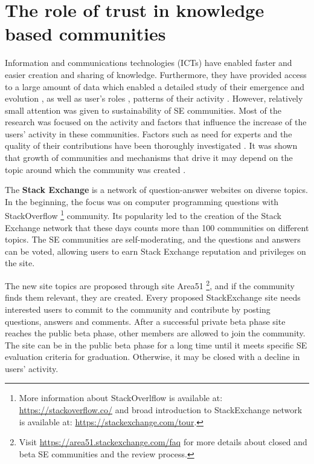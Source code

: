 
\chapter{The role of trust in knowledge based communities} %
\label{ChapterTrust}

Information and communications technologies (ICTs) have enabled faster and easier creation and sharing of knowledge. Furthermore, they have provided access to a large amount of data which enabled a detailed study of their emergence and evolution \cite{dankulov2015dynamics}, as well as user's roles \cite{saxena2021users}, patterns of their activity \cite{santos2019activity, slag2015one, chhabra2020activity}. 
However, relatively small attention was given to sustainability of SE communities. Most of the research was focused on the activity and factors that influence the increase of the users’ activity in these communities. Factors such as need for experts and the quality of their contributions have been thoroughly investigated \cite{dev2018size}. It was shown that growth of communities and mechanisms that drive it may depend on the topic around which the community was created \cite{santos2019self}.

The \textbf{Stack Exchange} is a network of question-answer websites on diverse topics. In the beginning, the focus was on computer programming questions with StackOverflow \footnote{
	More information about StackOverlflow is available at: \url{https://stackoverflow.co/} and broad introduction to StackExchange network is available at: \url{https://stackexchange.com/tour}. 
}  community. Its popularity led to the creation of the Stack Exchange network that these days counts more than 100 communities on different topics. The SE communities are self-moderating, and the questions and answers can be voted, allowing users to earn Stack Exchange reputation and privileges on the site. 

The new site topics are proposed through site Area51 \footnote{Visit \url{https://area51.stackexchange.com/faq} for more details about closed and beta SE communities and the review process.}, and if the community finds them relevant, they are created. Every proposed  StackExchange site needs interested users to commit to the community and contribute by posting questions, answers and comments. After a successful private beta phase site reaches the public beta phase, other members are allowed to join the community. The site can be in the public beta phase for a long time until it meets specific SE evaluation criteria for graduation. Otherwise, it may be closed with a decline in users' activity. 

